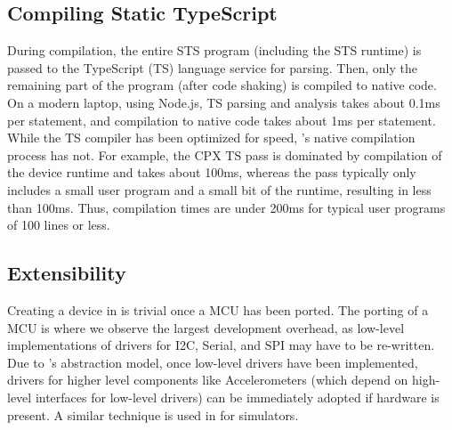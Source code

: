 



\subsection{Compiling Static TypeScript}

During compilation, the entire STS program (including the STS runtime) is passed to the TypeScript (TS) language service for parsing. Then, only the remaining part of the program (after code shaking) is compiled to native code. On a modern laptop, using Node.js, TS parsing and analysis takes about 0.1ms per statement, and \MC compilation to native code takes about 1ms per statement.
While the TS compiler has been optimized for speed, \MCN's native compilation process has not. For example, the CPX TS pass is dominated by compilation of the device runtime and takes about 100ms, whereas the \MC pass typically only includes a small user program and a small bit of the runtime, resulting in less than 100ms. Thus, compilation times are under 200ms for typical user programs of 100 lines or less.

\subsection{Extensibility}

Creating a device in \CO is trivial once a MCU has been ported. The porting of a MCU is where we observe the largest development overhead, as low-level implementations of drivers for I2C, Serial, and SPI may have to be re-written. Due to \CON's abstraction model, once low-level drivers have been implemented, drivers for higher level components like Accelerometers (which depend on high-level interfaces for low-level drivers) can be immediately adopted if hardware is present. A similar technique is used in \MC for simulators.

